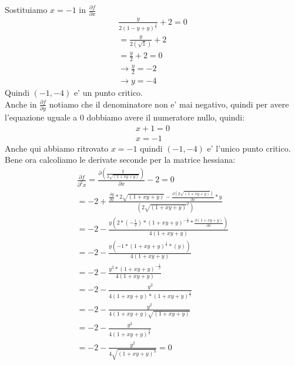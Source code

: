 \documentclass{article}
\begin{document}
Sostituiamo $x=-1$ in $\frac{\partial f}{\partial x}$
\begin{align*}
    \frac{y}{2(1-y+y)^\frac{1}{2}} +2 =0\\ 
    = \frac{y}{2(\sqrt{1})}+2 \\
    = \frac{y}{2}+2 =0\\
    \to \frac{y}{2}=-2 \\
    \to y = -4
\end{align*}
Quindi $(-1,-4)$ e' un punto critico. \\
Anche in $\frac{\partial f}{\partial y}$ notiamo che il denominatore non e' mai negativo, quindi per avere l'equazione uguale a 0 dobbiamo avere il numeratore nullo, quindi:
\begin{align*}
    x+1=0 \\
    x=-1
\end{align*}
Anche qui abbiamo ritrovato $x=-1$ quindi $(-1,-4)$ e' l'unico punto critico. \\
Bene ora calcoliamo le derivate seconde per la matrice hessiana:
\begin{align*}
    \frac{\partial f}{\partial^2 x}=\frac{\partial(\frac{y}{2\sqrt{(1+xy+y)}})}{\partial x}-2 =0\\
    = -2 + \frac{\frac{\partial y}{\partial x}* 2\sqrt{(1+xy+y)} - \frac{\partial (2\sqrt{(1+xy+y)})}{\partial x}*y}{(2\sqrt{(1+xy+y)}^2)} \\
    = -2 - \frac{y(2*(-\frac{1}{2})*(1+xy+y)^{-\frac{1}{2}}*\frac{\partial (1+xy+y)}{\partial x})}{4(1+xy+y)} \\
    = -2 - \frac{y(-1*(1+xy+y)^{\frac{1}{2}} * (y))}{4(1+xy+y)} \\
    = -2 - \frac{y^2 * (1+xy+y)^{-\frac{1}{2}}}{4(1+xy+y)} \\
    = -2 - \frac{y^2}{4(1+xy+y)*(1+xy+y)^{\frac{1}{2}}} \\
    = -2 - \frac{y^2}{4(1+xy+y)\sqrt{(1+xy+y)}} \\
    = -2 - \frac{y^2}{4(1+xy+y)^{\frac{3}{2}}} \\
    = -2 - \frac{y^2}{4\sqrt{(1+xy+y)^3}} =0
\end{align*}
\end{document}
